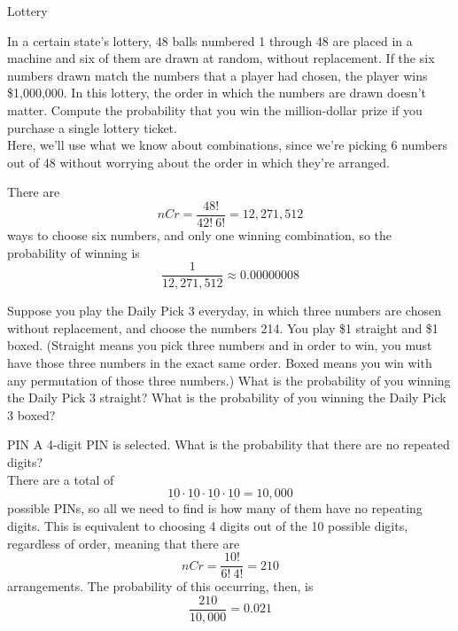 \begin{example}[https://www.youtube.com/watch?v=qJExejyTNzY]{Lottery}

In a certain state's lottery, 48 balls numbered 1 through 48 are placed in a machine and six of them are drawn at random, without replacement. If the six numbers drawn match the numbers that a player had chosen, the player wins \$1,000,000. In this lottery, the order in which the numbers are drawn doesn't matter. Compute the probability that you win the million-dollar prize if you purchase a single lottery ticket.\\

  Here, we'll use what we know about combinations, since we're picking 6 numbers out of 48 without worrying about the order in which they're arranged.

There are \[nCr = \dfrac{48!}{42! \ 6!} = 12,271,512\] ways to choose six numbers, and only one winning combination, so the probability of winning is \[\dfrac{1}{12,271,512} \approx 0.00000008\]
\end{example}

\begin{try}
Suppose you play the Daily Pick 3 everyday, in which three numbers are chosen without replacement, and choose the numbers 214.
You play \$1 straight and \$1 boxed. (Straight means you pick three numbers and in order to
win, you must have those three numbers in the exact same order. Boxed means you win with
any permutation of those three numbers.) What is the probability of you winning the Daily
Pick 3 straight? What is the probability of you winning the Daily Pick 3 boxed?
\end{try}
\vfill
\pagebreak

\begin{example}[https://www.youtube.com/watch?v=D_HPDTJlKNY]{PIN}
A 4-digit PIN is selected. What is the probability that there are no repeated digits?\\

 There are a total of \[\underline{10} \cdot 
\underline{10} \cdot \underline{10} \cdot \underline{10} = 10,000\] possible PINs, so all we need to find is how many of them have no repeating digits.  This is equivalent to choosing 4 digits out of the 10 possible digits, regardless of order, meaning that there are \[nCr = \dfrac{10!}{6! \ 4!} = 210\] arrangements.  The probability of this occurring, then, is \[\dfrac{210}{10,000} = 0.021\]
\end{example}

